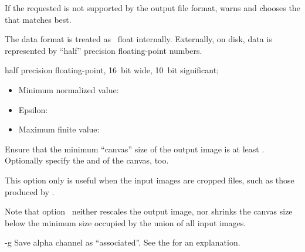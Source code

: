 \begin{codelist}
  If the requested  is not supported by the output file format, \App{} warns and
  chooses the  that matches best.

  \noindent The  data format is
  treated as ~float internally.  Externally, on disk,  data is
  represented by ``half'' precision floating-point numbers.

   half precision floating-point,
  16~bit wide, 10~bit significant;

  \begin{itemize}
  \item
    Minimum normalized value: 
  \item
    Epsilon: 
  \item
    Maximum finite value: 
  \end{itemize}


  \label{opt:f}%
\item[-f \metavar{WIDTH}x\metavar{HEIGHT}%
  \optional{+x\metavar{XOFFSET}+y\metavar{YOFFSET}}]\itemend
  Ensure that the minimum ``canvas'' size of
  the output image is at least \classictimes{}.  Optionally specify
  the  and  of the canvas, too.

  This option only is useful when the input images are cropped  files, such as
  those produced by .

  Note that option~ neither rescales the output image, nor shrinks the canvas size
  below the minimum size occupied by the union of all input images.


  \label{opt:g}%
\item[-g]
  Save alpha channel as ``associated''. See the
   for an explanation.


\end{codelist}
